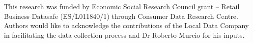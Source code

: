 This research was funded by Economic Social Research Council grant – Retail Business Datasafe (ES/L011840/1) through Consumer Data Research Centre.
Authors would like to acknowledge the contributions of the Local Data Company in facilitating the data collection process and Dr Roberto Murcio for his inputs.
